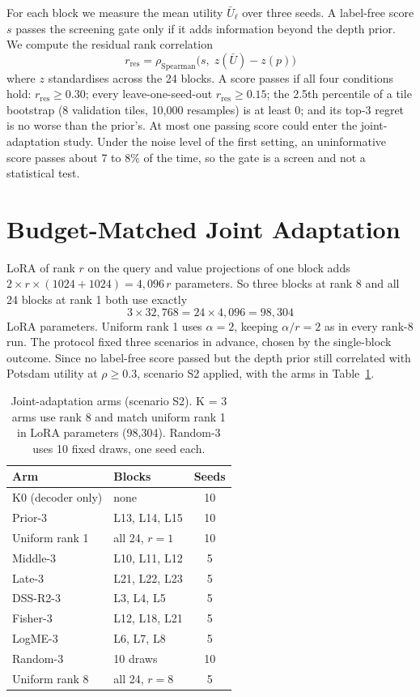 \documentclass[11pt,a4paper]{report}
\begin{document}
For each block we measure the mean utility $\bar U_\ell$ over three seeds. A label-free score $s$ passes the screening gate only if it adds information beyond the depth prior. We compute the residual rank correlation
\begin{equation}
    r_{\text{res}} = \rho_{\text{Spearman}}\bigl(s,\; z(\bar U) - z(p)\bigr)
\end{equation}
where $z$ standardises across the 24 blocks. A score passes if all four conditions hold: $r_{\text{res}} \geq 0.30$; every leave-one-seed-out $r_{\text{res}} \geq 0.15$; the 2.5th percentile of a tile bootstrap (8 validation tiles, 10,000 resamples) is at least 0; and its top-3 regret is no worse than the prior's. At most one passing score could enter the joint-adaptation study. Under the noise level of the first setting, an uninformative score passes about 7 to 8\% of the time, so the gate is a screen and not a statistical test.

\section{Budget-Matched Joint Adaptation}

LoRA of rank $r$ on the query and value projections of one block adds $2 \times r \times (1024 + 1024) = 4{,}096\,r$ parameters. So three blocks at rank 8 and all 24 blocks at rank 1 both use exactly
\begin{equation}
    3 \times 32{,}768 = 24 \times 4{,}096 = 98{,}304
\end{equation}
LoRA parameters. Uniform rank 1 uses $\alpha = 2$, keeping $\alpha/r = 2$ as in every rank-8 run. The protocol fixed three scenarios in advance, chosen by the single-block outcome. Since no label-free score passed but the depth prior still correlated with Potsdam utility at $\rho \geq 0.3$, scenario S2 applied, with the arms in Table~\ref{tab:arms}.

\begin{table}[t]
\centering
\caption{Joint-adaptation arms (scenario S2). K = 3 arms use rank 8 and match uniform rank 1 in LoRA parameters (98,304). Random-3 uses 10 fixed draws, one seed each.}
\label{tab:arms}
\small
\setlength{\tabcolsep}{4pt}
\begin{tabular}{@{}llc@{}}
\toprule
\textbf{Arm} & \textbf{Blocks} & \textbf{Seeds} \\
\midrule
K0 (decoder only) & none & 10 \\
Prior-3 & L13, L14, L15 & 10 \\
Uniform rank 1 & all 24, $r = 1$ & 10 \\
Middle-3 & L10, L11, L12 & 5 \\
Late-3 & L21, L22, L23 & 5 \\
DSS-R2-3 & L3, L4, L5 & 5 \\
Fisher-3 & L12, L18, L21 & 5 \\
LogME-3 & L6, L7, L8 & 5 \\
Random-3 & 10 draws & 10 \\
Uniform rank 8 & all 24, $r = 8$ & 5 \\
\bottomrule
\end{tabular}
\end{table}
\end{document}
